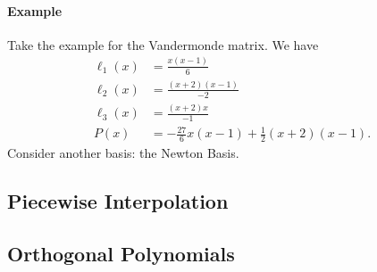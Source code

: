 \documentclass[5pt, a4paper]{article}
\begin{document}
\paragraph{Example} Take the example for the Vandermonde matrix. We have 
\begin{align*}
    \ell_1 (x) &= \frac{x(x-1)}{6} \\
    \ell_2 (x) &= \frac{(x + 2)(x-1)}{-2}  \\
    \ell_3 (x) &= \frac{(x + 2)x}{-1}  \\
    P(x) &= -\frac{27}{6}x(x-1) + \frac{1}{2}(x+2)(x-1)
.\end{align*}
Consider another basis: the Newton Basis.




\subsection*{Piecewise Interpolation}
\subsection*{Orthogonal Polynomials}
\end{document}
